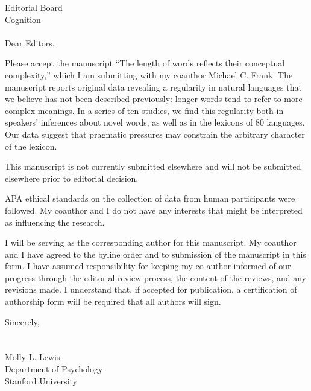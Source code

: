 \documentclass{letter}
\begin{document}
\begin{letter}



\opening{Editorial Board\\ 
Cognition\\
~\\
Dear Editors,}

Please accept the manuscript ``The length of words reflects their conceptual complexity,'' which I am submitting with my coauthor Michael C. Frank. The manuscript reports original data revealing a regularity in natural languages that we believe has not been described previously: longer words tend to refer to more complex meanings. In a series of ten studies, we find this regularity both in speakers' inferences about novel words, as well as in the lexicons of 80 languages. Our data suggest that pragmatic pressures may constrain the arbitrary character of the lexicon.

This manuscript is not currently submitted elsewhere and will not be submitted elsewhere prior to editorial decision.

APA ethical standards on the collection of data from human participants were followed. My coauthor and I do not have any interests that might be interpreted as influencing the research.

I will be serving as the corresponding author for this manuscript. My coauthor and I have agreed to the byline order and to submission of the manuscript in this form. I have assumed responsibility for keeping my co-author informed of our progress through the editorial review process, the content of the reviews, and any revisions made. I understand that, if accepted for publication, a certification of authorship form will be required that all authors will sign.

Sincerely,\\
\\
\\
Molly L. Lewis\\
Department of Psychology\\
Stanford University\\

\end{letter}
\end{document}
